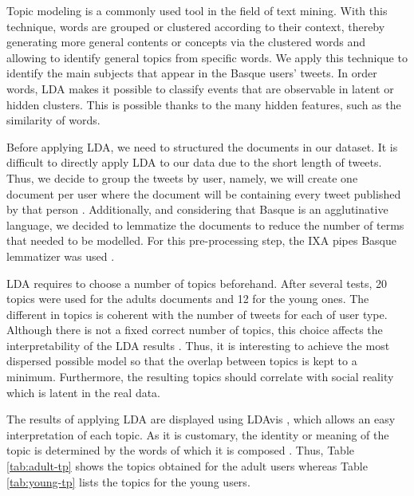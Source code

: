 \documentclass[information,article,submit,moreauthors,pdftex,10pt,a4paper]{Definitions/mdpi}
\begin{document}
Topic modeling is a commonly used tool in the field of text mining. With this technique, words are grouped or clustered according to their context, thereby generating more general contents or concepts via the clustered words and allowing to identify general topics from specific words. We apply this technique to identify the main subjects that appear in the Basque users' tweets. In order words, LDA  makes it possible to classify events that are observable in latent or hidden clusters. This is possible thanks to the many hidden features, such as the similarity of words.

Before applying LDA, we need to structured the documents in our dataset. It is difficult to directly apply LDA to our data due to the short length of tweets. Thus, we decide to group the tweets by user, namely, we will create one document per user where the document will be containing every tweet published by that person \cite{hong2010empirical, zhao2011comparing}. Additionally, and considering that Basque is an agglutinative language, we decided to lemmatize the documents to reduce the number of terms that needed to be modelled. For this pre-processing step, the IXA pipes Basque lemmatizer  was used \cite{agerri2014ixa}.

LDA requires to choose a number of topics beforehand. After several tests, 20 topics were used for the adults documents and 12 for the young ones. The different in topics is coherent with the number of tweets for each of user type. Although there is not a fixed correct number of topics, this choice affects the interpretability of the LDA results \cite{binkley2014understanding,steyvers2007probabilistic}. Thus, it is interesting to achieve the most dispersed possible model so that the overlap between topics is kept to a minimum. Furthermore, the resulting topics should correlate with social reality which is latent in the real data.

The results of applying LDA are displayed using LDAvis \cite{sievert2014ldavis}, which allows an easy interpretation of each topic. As it is customary, the identity or meaning of the topic is determined by the words of which it is composed \cite{binkley2014understanding}. Thus, Table \ref{tab:adult-tp} shows the topics obtained for the adult users whereas Table \ref{tab:young-tp} lists the topics for the young users.
\end{document}
